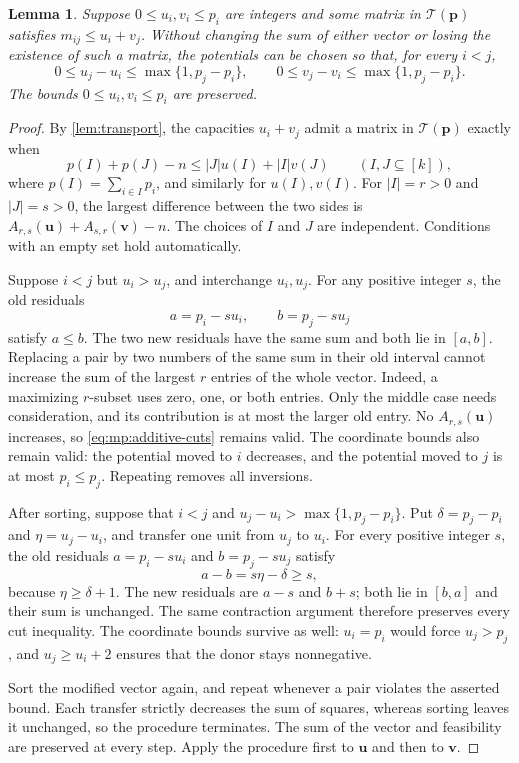 \documentclass[11pt,reqno]{amsart}
\numberwithin{equation}{section}
\newtheorem{lemma}[theorem]{Lemma}
\theoremstyle{definition}
\theoremstyle{remark}
\begin{document}
\begin{lemma}\label{lem:mp:ordered-potentials}
Suppose $0\le u_i,v_i\le p_i$ are integers and some matrix in
$\mathcal T(\mathbf p)$ satisfies $m_{ij}\le u_i+v_j$.
Without changing the sum of either vector or losing the existence of
such a matrix, the potentials can be chosen so that, for every $i<j$,
\[
 0\le u_j-u_i\le\max\{1,p_j-p_i\},\qquad
 0\le v_j-v_i\le\max\{1,p_j-p_i\}.
\]
The bounds $0\le u_i,v_i\le p_i$ are preserved.
\end{lemma}
\begin{proof}
By \cref{lem:transport}, the capacities $u_i+v_j$ admit a matrix
in $\mathcal T(\mathbf p)$ exactly when
\begin{equation}\label{eq:mp:additive-cuts}
 p(I)+p(J)-n\le |J|u(I)+|I|v(J)
 \qquad(I,J\subseteq[k]),
\end{equation}
where $p(I)=\sum_{i\in I}p_i$, and similarly for $u(I),v(I)$.
For $|I|=r>0$ and $|J|=s>0$, the largest difference between the two
sides is
$A_{r,s}(\mathbf u)+A_{s,r}(\mathbf v)-n$. The choices of $I$ and
$J$ are independent. Conditions with an empty set hold automatically.

Suppose $i<j$ but $u_i>u_j$, and interchange $u_i,u_j$. For any positive
integer $s$, the old residuals
\[
 a=p_i-su_i,\qquad b=p_j-su_j
\]
satisfy $a\le b$. The two new residuals have the same sum and both lie
in $[a,b]$. Replacing a pair by two numbers of the same sum in their
old interval cannot increase the sum of the largest $r$ entries of the
whole vector. Indeed, a maximizing $r$-subset uses zero, one, or both
entries. Only the middle case needs consideration, and its contribution
is at most the larger old entry. No $A_{r,s}(\mathbf u)$ increases, so
\eqref{eq:mp:additive-cuts} remains valid. The coordinate bounds also
remain valid: the potential moved to $i$ decreases, and the potential
moved to $j$ is at most $p_i\le p_j$. Repeating removes all inversions.

After sorting, suppose that $i<j$ and
$u_j-u_i>\max\{1,p_j-p_i\}$. Put
$\delta=p_j-p_i$ and $\eta=u_j-u_i$, and transfer one unit from
$u_j$ to $u_i$. For every positive integer $s$, the old residuals
$a=p_i-su_i$ and $b=p_j-su_j$ satisfy
\[
 a-b=s\eta-\delta\ge s,
\]
because $\eta\ge\delta+1$. The new residuals are $a-s$ and $b+s$;
both lie in $[b,a]$ and their sum is unchanged. The same contraction
argument therefore preserves every cut inequality.
The coordinate bounds survive as well: $u_i=p_i$ would force
$u_j>p_j$, and $u_j\ge u_i+2$ ensures that the donor stays nonnegative.

Sort the modified vector again, and repeat whenever a pair violates
the asserted bound. Each transfer strictly decreases the sum of squares,
whereas sorting leaves it unchanged, so the procedure terminates.
The sum of the vector and feasibility are preserved at every step.
Apply the procedure first to $\mathbf u$ and then to $\mathbf v$.
\end{proof}
\end{document}

